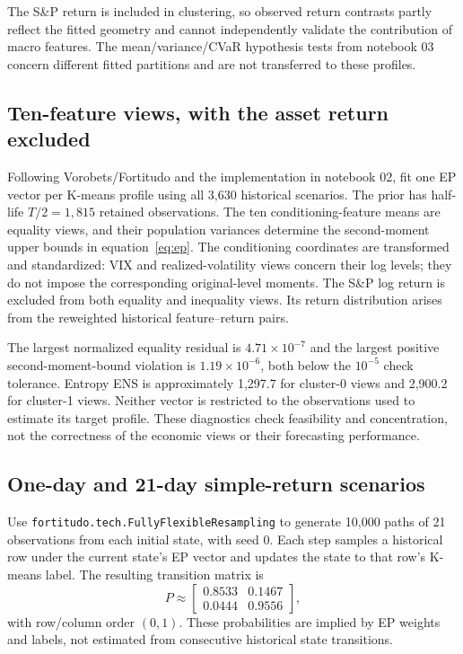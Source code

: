 \documentclass[11pt,a4paper]{article}
\begin{document}
The S\&P return is included in clustering, so observed return contrasts partly reflect the fitted geometry and cannot independently validate the contribution of macro features. The mean/variance/CVaR hypothesis tests from notebook 03 concern different fitted partitions and are not transferred to these profiles.

\subsection{Ten-feature views, with the asset return excluded}

Following Vorobets/Fortitudo and the implementation in notebook 02, fit one EP vector per K-means profile using all 3,630 historical scenarios. The prior has half-life $T/2=1,815$ retained observations. The ten conditioning-feature means are equality views, and their population variances determine the second-moment upper bounds in equation~\eqref{eq:ep}. The conditioning coordinates are transformed and standardized: VIX and realized-volatility views concern their log levels; they do not impose the corresponding original-level moments. The S\&P log return is excluded from both equality and inequality views. Its return distribution arises from the reweighted historical feature--return pairs.



The largest normalized equality residual is $4.71\times10^{-7}$ and the largest positive second-moment-bound violation is $1.19\times10^{-6}$, both below the $10^{-5}$ check tolerance. Entropy ENS is approximately 1,297.7 for cluster-0 views and 2,900.2 for cluster-1 views. Neither vector is restricted to the observations used to estimate its target profile. These diagnostics check feasibility and concentration, not the correctness of the economic views or their forecasting performance.

\subsection{One-day and 21-day simple-return scenarios}

Use \texttt{fortitudo.tech.FullyFlexibleResampling} to generate 10,000 paths of 21 observations from each initial state, with seed 0. Each step samples a historical row under the current state's EP vector and updates the state to that row's K-means label. The resulting transition matrix is
\begin{equation}
P\approx\begin{bmatrix}
0.8533 & 0.1467\\
0.0444 & 0.9556
\end{bmatrix},
\label{eq:fixed11-transition}
\end{equation}
with row/column order $(0,1)$. These probabilities are implied by EP weights and labels, not estimated from consecutive historical state transitions.
\end{document}
